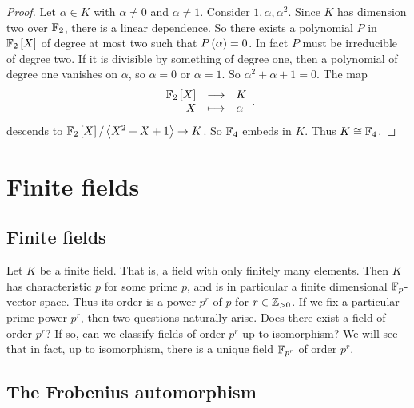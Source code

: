\begin{proof}
Let $ \alpha \in K $ with $ \alpha \ne 0 $ and $ \alpha \ne 1 $. Consider $ 1, \alpha, \alpha^2 $. Since $ K $ has dimension two over $ \mathbb{F}_2 $, there is a linear dependence. So there exists a polynomial $ P $ in $ \F_2\sbr{X} $ of degree at most two such that $ P\br{\alpha} = 0 $. In fact $ P $ must be irreducible of degree two. If it is divisible by something of degree one, then a polynomial of degree one vanishes on $ \alpha $, so $ \alpha = 0 $ or $ \alpha = 1 $. So $ \alpha^2 + \alpha + 1 = 0 $. The map
$$ \function{\F_2\sbr{X}}{K}{X}{\alpha}. $$
descends to $ \F_2\sbr{X} / \abr{X^2 + X + 1} \to K $. So $ \mathbb{F}_4 $ embeds in $ K $. Thus $ K \cong \mathbb{F}_4 $.
\end{proof}

\pagebreak

\section{Finite fields}


\subsection{Finite fields}

Let $ K $ be a finite field. That is, a field with only finitely many elements. Then $ K $ has characteristic $ p $ for some prime $ p $, and is in particular a finite dimensional $ \mathbb{F}_p $-vector space. Thus its order is a power $ p^r $ of $ p $ for $ r \in \mathbb{Z}_{> 0} $. If we fix a particular prime power $ p^r $, then two questions naturally arise. Does there exist a field of order $ p^r $? If so, can we classify fields of order $ p^r $ up to isomorphism? We will see that in fact, up to isomorphism, there is a unique field $ \mathbb{F}_{p^r} $ of order $ p^r $.

\subsection{The Frobenius automorphism}

